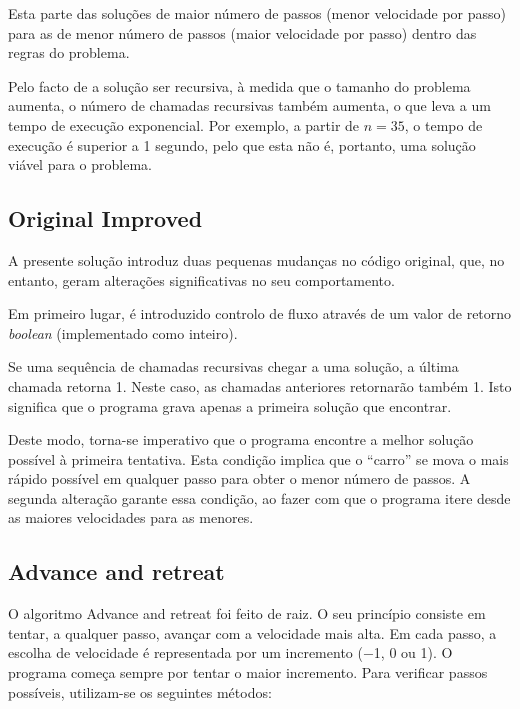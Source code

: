 \documentclass[portuguese,11pt,a4paper,titlepage]{article}
\newcommand{\foreign}[1]{\textit{#1}}
\newcommand{\srcdir}{..}
\begin{document}
Esta parte das soluções de maior número de passos (menor velocidade por passo) para
as de menor número de passos (maior velocidade por passo) dentro das regras do problema.

Pelo facto de a solução ser recursiva, à medida que o tamanho do problema aumenta,
o número de chamadas recursivas também aumenta, o que leva a um tempo de execução exponencial.
Por exemplo, a partir de \begin{math}n = 35\end{math}, o tempo de execução é superior a 1 segundo,
pelo que esta não é, portanto, uma solução viável para o problema. 

\subsection{Original Improved} \label{original_improved}
A presente solução introduz duas pequenas mudanças no código original, que, no entanto,
geram alterações significativas no seu comportamento.

Em primeiro lugar, é introduzido controlo de fluxo através de um valor de retorno
\foreign{boolean} (implementado como inteiro).

Se uma sequência de chamadas recursivas chegar a uma solução, a última chamada
retorna 1. 
Neste caso, as chamadas anteriores retornarão também 1.
Isto significa que o programa grava apenas a primeira solução que encontrar.

Deste modo, torna-se imperativo que o programa encontre a melhor solução possível
à primeira tentativa. Esta condição implica que o ``carro'' se mova o mais rápido possível
em qualquer passo para obter o menor número de passos. A segunda alteração
garante essa condição, ao fazer com que o programa itere
desde as maiores velocidades para as menores.


\subsection{Advance and retreat}
O algoritmo Advance and retreat foi feito de raiz. O seu princípio 
consiste em tentar, a qualquer passo, avançar com a velocidade mais alta.
Em cada passo, a escolha de velocidade é representada por um incremento
($-$1, 0 ou 1). O programa começa sempre por tentar o maior incremento.
Para verificar passos possíveis, utilizam-se os seguintes métodos:
\end{document}
